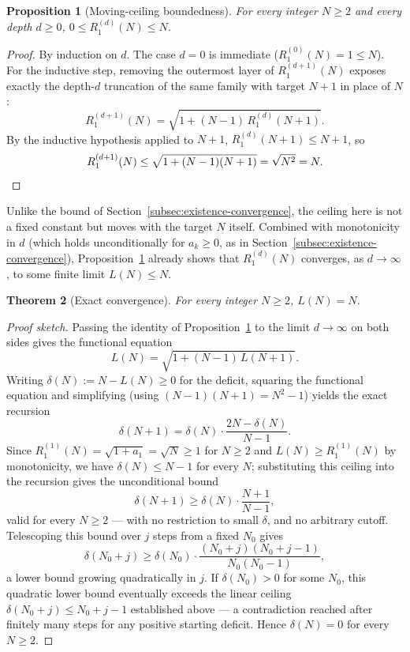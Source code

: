 \documentclass[11pt,a4paper]{amsart}
\theoremstyle{plain}
\newtheorem{theorem}{Theorem}
\newtheorem{proposition}[theorem]{Proposition}
\theoremstyle{definition}
\theoremstyle{remark}
\begin{document}
\begin{proposition}[Moving-ceiling boundedness]
\label{prop:moving-ceiling}
For every integer $N \ge 2$ and every depth $d \ge 0$, $0 \le R_1^{(d)}(N) \le N$.
\end{proposition}

\begin{proof}
By induction on $d$. The case $d=0$ is immediate ($R_1^{(0)}(N) = 1 \le N$). For the inductive step, removing the outermost layer of $R_1^{(d+1)}(N)$ exposes exactly the depth-$d$ truncation of the same family with target $N+1$ in place of $N$:
\[
R_1^{(d+1)}(N) = \sqrt{1+(N-1)\,R_1^{(d)}(N+1)}.
\]
By the inductive hypothesis applied to $N+1$, $R_1^{(d)}(N+1) \le N+1$, so
\[
R_1^{(d+1)}(N) \le \sqrt{1+(N-1)(N+1)} = \sqrt{N^2} = N. \qedhere
\]
\end{proof}

Unlike the bound of Section~\ref{subsec:existence-convergence}, the ceiling here is not a fixed constant but moves with the target $N$ itself. Combined with monotonicity in $d$ (which holds unconditionally for $a_k \ge 0$, as in Section~\ref{subsec:existence-convergence}), Proposition~\ref{prop:moving-ceiling} already shows that $R_1^{(d)}(N)$ converges, as $d \to \infty$, to some finite limit $L(N) \le N$.

\begin{theorem}[Exact convergence]
\label{thm:exact-convergence}
For every integer $N \ge 2$, $L(N) = N$.
\end{theorem}

\begin{proof}[Proof sketch]
Passing the identity of Proposition~\ref{prop:moving-ceiling} to the limit $d \to \infty$ on both sides gives the functional equation
\[
L(N) = \sqrt{1 + (N-1)\, L(N+1)}.
\]
Writing $\delta(N) := N - L(N) \ge 0$ for the deficit, squaring the functional equation and simplifying (using $(N-1)(N+1)=N^2-1$) yields the exact recursion
\[
\delta(N+1) = \delta(N)\cdot \frac{2N - \delta(N)}{N-1}.
\]
Since $R_1^{(1)}(N) = \sqrt{1+a_1} = \sqrt{N} \ge 1$ for $N \ge 2$ and $L(N) \ge R_1^{(1)}(N)$ by monotonicity, we have $\delta(N) \le N-1$ for every $N$; substituting this ceiling into the recursion gives the unconditional bound
\[
\delta(N+1) \ge \delta(N)\cdot \frac{N+1}{N-1},
\]
valid for every $N \ge 2$ — with no restriction to small $\delta$, and no arbitrary cutoff. Telescoping this bound over $j$ steps from a fixed $N_0$ gives
\[
\delta(N_0+j) \ge \delta(N_0)\cdot \frac{(N_0+j)(N_0+j-1)}{N_0(N_0-1)},
\]
a lower bound growing quadratically in $j$. If $\delta(N_0) > 0$ for some $N_0$, this quadratic lower bound eventually exceeds the linear ceiling $\delta(N_0+j) \le N_0+j-1$ established above — a contradiction reached after finitely many steps for any positive starting deficit. Hence $\delta(N) = 0$ for every $N \ge 2$. \qedhere
\end{proof}
\end{document}
